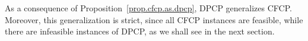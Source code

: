 \documentclass[preprint, 11pt, authoryear]{elsarticle}
\newcommand{\hip}{{\mathcal H}}
\newcommand{\VV}{{\mathcal V}}
\newcommand{\EE}{{\mathcal E}}
\newcommand{\card}[1]{\left| #1 \right|}
\newcommand{\cn}[1]{\chi(#1)}
\newcommand{\cfcn}[1]{\chi_{CF}(#1)}
\newcommand{\cfcnT}[1]{\chi_{CF}^{T}(#1)}
\begin{document}
As a consequence of Proposition~\ref{prop.cfcp.as.dpcp}, DPCP generalizes CFCP. Moreover, this generalization is strict, since all CFCP instances are feasible, while there are infeasible instances of DPCP, as we shall see in the next section.




\end{document}
